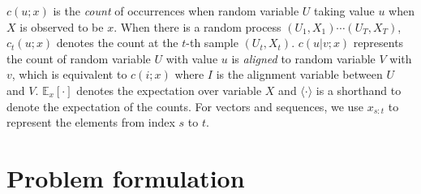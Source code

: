 \documentclass[journal]{IEEEtran}
\begin{document}
$c(u; x)$ is the \textit{count} of occurrences when random variable $U$ taking value $u$ when $X$ is observed to be $x$. When there is a random process $(U_1, X_1) \cdots (U_T, X_T)$, $c_t(u; x)$ denotes the count at the $t$-th sample $(U_t, X_t)$. $c(u|v; x)$ represents the count of random variable $U$ with value $u$ is \textit{aligned} to random variable $V$ with $v$, which is equivalent to $c(i; x)$ where $I$ is the alignment variable between $U$ and $V$. $\mathbb E_x[\cdot]$ denotes the expectation over variable $X$ and $\langle \cdot \rangle$ is a shorthand to denote the expectation of the counts. For vectors and sequences, we use $x_{s:t}$ to represent the elements from index $s$ to $t$. 

\section{Problem formulation}
\end{document}
